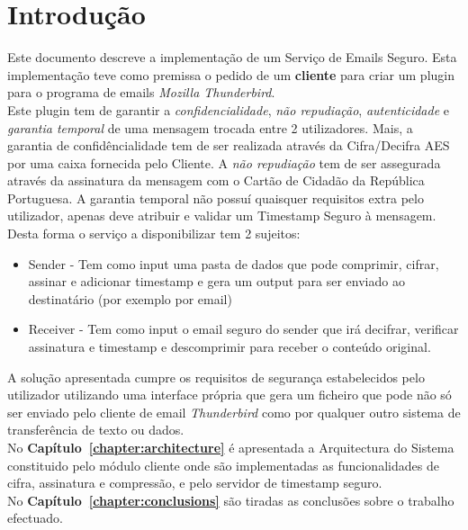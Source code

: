 \chapter{Introdução}
\label{chapter:introduction}
Este documento descreve a implementação de um Serviço de Emails Seguro. Esta implementação teve como premissa o pedido de um \textbf{cliente} para criar um plugin para o programa de emails \textit{Mozilla Thunderbird}. \\
Este plugin tem de garantir a \textit{confidencialidade}, \textit{não repudiação}, \textit{autenticidade} e \textit{garantia 
temporal} de uma mensagem trocada entre 2 utilizadores. Mais, a garantia de 
confidêncialidade tem de ser realizada através da Cifra/Decifra AES por uma caixa fornecida pelo 
Cliente. A \textit{não repudiação }tem de ser assegurada através da assinatura da 
mensagem com o Cartão de Cidadão da República Portuguesa. A garantia temporal 
não possuí quaisquer requisitos extra pelo utilizador, apenas deve atribuir e validar um Timestamp Seguro à mensagem.
\\
Desta forma o serviço a disponibilizar tem 2 sujeitos:
\begin{itemize}
\item Sender -  Tem como input uma pasta de dados que pode comprimir, cifrar, assinar e adicionar timestamp 
e gera um output para ser enviado ao destinatário (por exemplo por email)
\item Receiver - Tem como input o email seguro do sender que irá decifrar, verificar assinatura e timestamp 
e descomprimir para receber o conteúdo original.
\end{itemize}
A solução apresentada cumpre os requisitos de segurança estabelecidos pelo 
utilizador utilizando uma interface própria que gera um ficheiro que pode não só 
ser enviado pelo cliente de email  \textit{Thunderbird} como por qualquer outro 
sistema de transferência de texto ou dados.\\

No \textbf{Capítulo~\ref{chapter:architecture}} é apresentada  a Arquitectura do Sistema constituido pelo módulo cliente onde são implementadas as funcionalidades de cifra, assinatura e compressão, e pelo servidor de timestamp seguro.\\
No \textbf{Capítulo~\ref{chapter:conclusions}} são tiradas as conclusões sobre o trabalho efectuado.
\newpage




